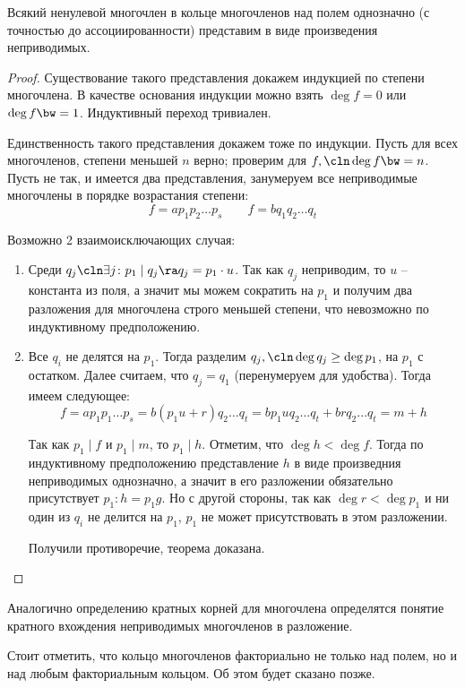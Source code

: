 \begin{theorem}
  Всякий ненулевой многочлен в кольце многочленов над полем однозначно (с точностью до ассоциированности) представим в виде произведения неприводимых.
\end{theorem}
\begin{proof}
  Существование такого представления докажем индукцией по степени многочлена. В качестве основания индукции можно взять $\deg f=0$ или $\deg f\bw=1$. Индуктивный переход тривиален.

  Единственность такого представления докажем тоже по индукции. Пусть для всех многочленов, степени меньшей $n$ верно; проверим для $f,\cln\deg f\bw=n$. Пусть не так, и имеется два представления, занумеруем все неприводимые многочлены в порядке возрастания степени:
  $$f=ap_1p_2\dots p_s\qquad f=bq_1q_2\dots q_t$$

  Возможно 2 взаимоисключающих случая:
  \begin{enumerate}
    \item Среди $q_j\cln\exists j\colon p_1\mid q_j\ra q_j=p_1\cdot u$. Так как $q_j$ неприводим, то $u$ -- константа из поля, а значит мы можем сократить на $p_1$ и получим два разложения для многочлена строго меньшей степени, что невозможно по индуктивному предположению.
    \item Все $q_i$ не делятся на $p_1$. Тогда разделим $q_j,\cln\deg q_j\ge\deg p_1$, на $p_1$ с остатком. Далее считаем, что $q_j = q_1$ (перенумеруем для удобства). Тогда имеем следующее:
    $$f=ap_1p_1\dots p_s=b(p_1u+r)q_2\dots q_t=bp_1uq_2\dots q_t+brq_2\dots q_t=m+h$$

    Так как $p_1\mid f$ и $p_1\mid m$, то $p_1\mid h$. Отметим, что $\deg h<\deg f$. Тогда по индуктивному предположению представление $h$ в виде произведния неприводимых однозначно, а значит в его разложении обязательно присутствует $p_1\colon h=p_1g$. Но с другой стороны, так как $\deg r<\deg p_1$ и ни один из $q_i$ не делится на $p_1$, $p_1$ не может присутствовать в этом разложении.

    Получили противоречие, теорема доказана.
  \end{enumerate}
\end{proof}

Аналогично определению кратных корней для многочлена определятся понятие кратного вхождения неприводимых многочленов в разложение.

Стоит отметить, что кольцо многочленов факториально не только над полем, но и над любым факториальным кольцом. Об этом будет сказано позже.

